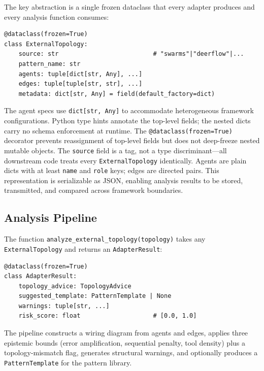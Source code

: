 \documentclass[11pt]{article}
\begin{document}
The key abstraction is a single frozen dataclass that every adapter
produces and every analysis function consumes:

\begin{lstlisting}[caption={ExternalTopology dataclass (convergence/types.py).},label=lst:topo]
@dataclass(frozen=True)
class ExternalTopology:
    source: str                          # "swarms"|"deerflow"|...
    pattern_name: str
    agents: tuple[dict[str, Any], ...]
    edges: tuple[tuple[str, str], ...]
    metadata: dict[str, Any] = field(default_factory=dict)
\end{lstlisting}

The agent specs use \texttt{dict[str, Any]} to accommodate heterogeneous
framework configurations.  Python type hints annotate the top-level
fields; the nested dicts carry no schema enforcement at runtime.
The \texttt{@dataclass(frozen=True)} decorator prevents reassignment
of top-level fields but does not deep-freeze nested mutable objects.
The \texttt{source} field is a tag, not a type discriminant---all
downstream code treats every \texttt{ExternalTopology} identically.
Agents are plain dicts with at least \texttt{name} and \texttt{role}
keys; edges are directed pairs.  This representation is serializable as
JSON, enabling analysis results to be stored, transmitted, and compared
across framework boundaries.

\subsection{Analysis Pipeline}

The function \texttt{analyze\_external\_topology(topology)} takes any
\texttt{ExternalTopology} and returns an \texttt{AdapterResult}:

\begin{lstlisting}[caption={AdapterResult dataclass (convergence/types.py).},label=lst:result]
@dataclass(frozen=True)
class AdapterResult:
    topology_advice: TopologyAdvice
    suggested_template: PatternTemplate | None
    warnings: tuple[str, ...]
    risk_score: float                    # [0.0, 1.0]
\end{lstlisting}

The pipeline constructs a wiring diagram from agents and edges, applies
three epistemic bounds (error amplification, sequential penalty, tool
density) plus a topology-mismatch flag, generates structural warnings, and optionally
produces a \texttt{PatternTemplate} for the pattern library.
\end{document}
